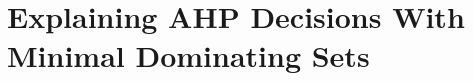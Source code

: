 \documentclass{jfp}
\begin{document}



\section{Explaining AHP Decisions With Minimal Dominating Sets}
\end{document}
